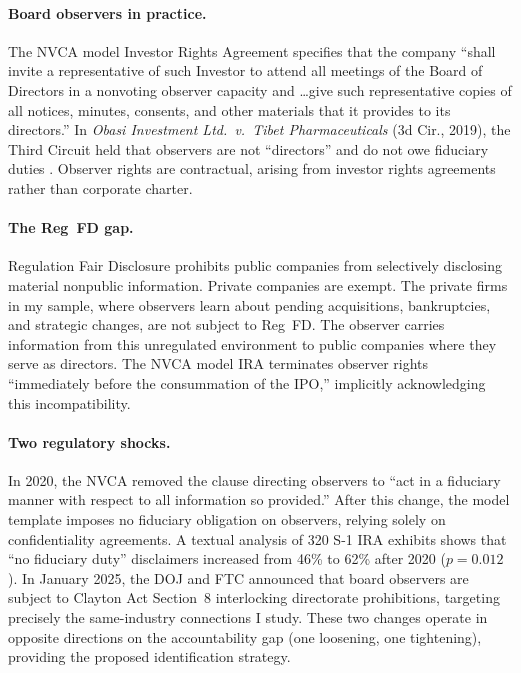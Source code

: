 \documentclass[12pt]{article}
\begin{document}
\paragraph{Board observers in practice.} The NVCA model Investor Rights Agreement specifies that the company ``shall invite a representative of such Investor to attend all meetings of the Board of Directors in a nonvoting observer capacity and \ldots give such representative copies of all notices, minutes, consents, and other materials that it provides to its directors.'' In \textit{Obasi Investment Ltd.\ v.\ Tibet Pharmaceuticals} (3d Cir., 2019), the Third Circuit held that observers are not ``directors'' and do not owe fiduciary duties \cite{packin2025board}. Observer rights are contractual, arising from investor rights agreements rather than corporate charter.

\paragraph{The Reg~FD gap.} Regulation Fair Disclosure prohibits public companies from selectively disclosing material nonpublic information. Private companies are exempt. The private firms in my sample, where observers learn about pending acquisitions, bankruptcies, and strategic changes, are not subject to Reg~FD. The observer carries information from this unregulated environment to public companies where they serve as directors. The NVCA model IRA terminates observer rights ``immediately before the consummation of the IPO,'' implicitly acknowledging this incompatibility.

\paragraph{Two regulatory shocks.} In 2020, the NVCA removed the clause directing observers to ``act in a fiduciary manner with respect to all information so provided.'' After this change, the model template imposes no fiduciary obligation on observers, relying solely on confidentiality agreements. A textual analysis of 320 S-1 IRA exhibits shows that ``no fiduciary duty'' disclaimers increased from 46\% to 62\% after 2020 ($p=0.012$). In January 2025, the DOJ and FTC announced that board observers are subject to Clayton Act Section~8 interlocking directorate prohibitions, targeting precisely the same-industry connections I study. These two changes operate in opposite directions on the accountability gap (one loosening, one tightening), providing the proposed identification strategy.
\end{document}
